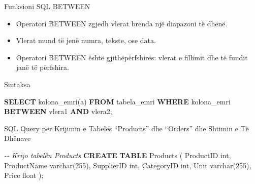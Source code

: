 \documentclass[
  ignorenonframetext,
]{beamer}
\newenvironment{Shaded}{\begin{snugshade}}{\end{snugshade}}
\newcommand{\CommentTok}[1]{\textcolor[rgb]{0.56,0.35,0.01}{\textit{#1}}}
\newcommand{\DataTypeTok}[1]{\textcolor[rgb]{0.13,0.29,0.53}{#1}}
\newcommand{\DecValTok}[1]{\textcolor[rgb]{0.00,0.00,0.81}{#1}}
\newcommand{\KeywordTok}[1]{\textcolor[rgb]{0.13,0.29,0.53}{\textbf{#1}}}
\newcommand{\NormalTok}[1]{#1}
\begin{document}
\begin{frame}{Funksioni SQL BETWEEN}
\label{funksioni-sql-between}
\begin{itemize}
\item
  Operatori BETWEEN zgjedh vlerat brenda një diapazoni të dhënë.
\item
  Vlerat mund të jenë numra, tekste, ose data.
\item
  Operatori BETWEEN është gjithëpërfshirës: vlerat e fillimit dhe të
  fundit janë të përfshira.
\end{itemize}
\end{frame}

\begin{frame}[fragile]{Sintaksa}
\label{sintaksa-2}
\begin{Shaded}
\begin{Highlighting}[]
\KeywordTok{SELECT}\NormalTok{ kolona\_emri(a)}
\KeywordTok{FROM}\NormalTok{ tabela\_emri}
\KeywordTok{WHERE}\NormalTok{ kolona\_emri }\KeywordTok{BETWEEN}\NormalTok{ vlera1 }\KeywordTok{AND}\NormalTok{ vlera2;}
\end{Highlighting}
\end{Shaded}
\end{frame}

\begin{frame}[fragile]{SQL Query për Krijimin e Tabelës ``Products'' dhe
``Orders'' dhe Shtimin e Të Dhënave}
\label{sql-query-puxebr-krijimin-e-tabeluxebs-products-dhe-orders-dhe-shtimin-e-tuxeb-dhuxebnave}
\begin{Shaded}
\begin{Highlighting}[]
\CommentTok{{-}{-} Krijo tabelën Products}
\KeywordTok{CREATE} \KeywordTok{TABLE}\NormalTok{ Products (}
\NormalTok{    ProductID }\DataTypeTok{int}\NormalTok{,}
\NormalTok{    ProductName }\DataTypeTok{varchar}\NormalTok{(}\DecValTok{255}\NormalTok{),}
\NormalTok{    SupplierID }\DataTypeTok{int}\NormalTok{,}
\NormalTok{    CategoryID }\DataTypeTok{int}\NormalTok{,}
\NormalTok{    Unit }\DataTypeTok{varchar}\NormalTok{(}\DecValTok{255}\NormalTok{),}
\NormalTok{    Price }\DataTypeTok{float}
\NormalTok{);}
\end{Highlighting}
\end{Shaded}
\end{frame}
\end{document}
